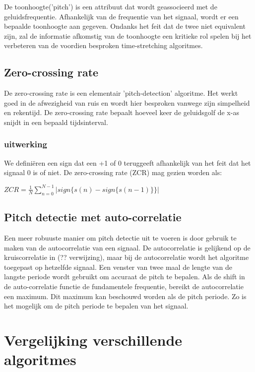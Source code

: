 \documentclass[12pt]{report}
\begin{document}
De toonhoogte('pitch') is een attribuut dat wordt geassocieerd met de geluidsfrequentie. Afhankelijk van de frequentie van het signaal, wordt er een bepaalde toonhoogte aan gegeven. Ondanks het feit dat de twee niet equivalent zijn, zal de informatie afkomstig van de toonhoogte een kritieke rol spelen bij het 
verbeteren van de voordien besproken time-stretching algoritmes.

\subsection{Zero-crossing rate}

De zero-crossing rate is een elementair 'pitch-detection' algoritme. Het werkt goed in de afwezigheid van ruis en wordt hier besproken vanwege zijn simpelheid en rekentijd. De zero-crossing rate bepaalt hoeveel keer de geluidsgolf de x-as snijdt in een bepaald tijdsinterval.

\subsubsection{uitwerking}

We definiëren een sign {} dat een +1 of 0 teruggeeft afhankelijk van het feit dat het signaal 0 is of niet. De zero-crossing rate (ZCR) mag gezien worden als:
\begin{center}
$ZCR=\frac{1}{N} \sum\limits_{n=0}^{N-1} |sign\{s(n)-sign\{s(n-1)\}\}|$
\end{center}

\subsection{Pitch detectie met auto-correlatie}
Een meer robuuste manier om pitch detectie uit te voeren is door gebruik te maken van de autocorrelatie van een signaal. De autocorrelatie is gelijkend op de kruiscorrelatie in (?? verwijzing), maar bij de autocorrelatie wordt het algoritme toegepast op hetzelfde signaal. 
Een venster van twee maal de lengte van de langste periode wordt  gebruikt om accuraat de pitch te bepalen. Als de shift in de auto-correlatie functie de fundamentele frequentie, bereikt de autocorrelatie een maximum. Dit maximum kan beschouwd worden als de pitch periode. Zo is het mogelijk om de pitch periode te bepalen van het signaal. 


\section{Vergelijking verschillende algoritmes}
\end{document}
